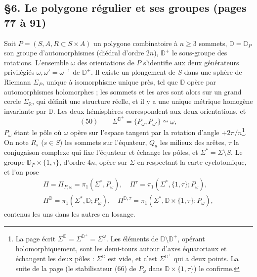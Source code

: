 \documentclass[11pt,a4paper]{article}
\begin{document}
\subsection*{§6. Le polygone régulier et ses groupes (pages 77 à 91)}

Soit $P = (S, A, R \subset S \times A)$ un polygone combinatoire à $n \geq 3$
sommets, $\mathbb{D} = \mathbb{D}_P$ son groupe d'automorphismes (diédral
d'ordre $2n$), $\mathbb{D}^+$ le sous-groupe des rotations. L'ensemble
$\underline{\omega}$ des orientations de $P$ s'identifie aux deux générateurs
privilégiés $\omega, \omega' = \omega^{-1}$ de $\mathbb{D}^+$. Il existe un
plongement de $S$ dans une sphère de Riemann $\Sigma_P$, unique à isomorphisme
unique près, tel que $\mathbb{D}$ opère par automorphismes holomorphes ; les
sommets et les arcs sont alors sur un grand cercle $\Sigma_{\mathbb{R}}$, qui
définit une structure réelle, et il y a une unique métrique homogène
invariante par $\mathbb{D}$. Les deux hémisphères correspondent aux deux
orientations, et
\[
(50)\qquad \Sigma^{\mathbb{D}^+} = \{P_\omega, P_{\omega'}\} \simeq \underline{\omega},
\]
$P_\omega$ étant le pôle où $\omega$ opère sur l'espace tangent par la rotation
d'angle $+2\pi/n$\footnote{La page écrit
$\Sigma^{\mathbb{D}} = \Sigma^{\mathbb{D}^+} = \Sigma^{\underline\omega}$. Les
éléments de $\mathbb{D} \setminus \mathbb{D}^+$, opérant holomorphiquement,
sont les demi-tours autour d'axes équatoriaux et échangent les deux pôles :
$\Sigma^{\mathbb{D}}$ est vide, et c'est $\Sigma^{\mathbb{D}^+}$ qui a deux
points. La suite de la page (le stabilisateur (66) de $P_\omega$ dans
$\mathbb{D} \times \{1, \tau\}$) le confirme.}. On note $R_s$ ($s \in S$) les
sommets sur l'équateur, $Q_a$ les milieux des arêtes, $\tau$ la conjugaison
complexe qui fixe l'équateur et échange les pôles, et
$\Sigma^* = \Sigma \setminus S$. Le groupe $\mathbb{D}_P \times \{1, \tau\}$,
d'ordre $4n$, opère sur $\Sigma$ en respectant la carte cyclotomique, et l'on
pose
\[
\begin{gathered}
\Pi = \Pi_{P,\omega} = \pi_1(\Sigma^*, P_\omega), \quad
\Pi^{\tau} = \pi_1(\Sigma^*, \{1, \tau\}; P_\omega), \\
\Pi^{\mathbb{D}} = \pi_1(\Sigma^*, \mathbb{D}; P_\omega), \quad
\Pi^{\mathbb{D},\tau} = \pi_1(\Sigma^*, \mathbb{D} \times \{1, \tau\}; P_\omega),
\end{gathered}
\]
contenus les uns dans les autres en losange.
\end{document}
